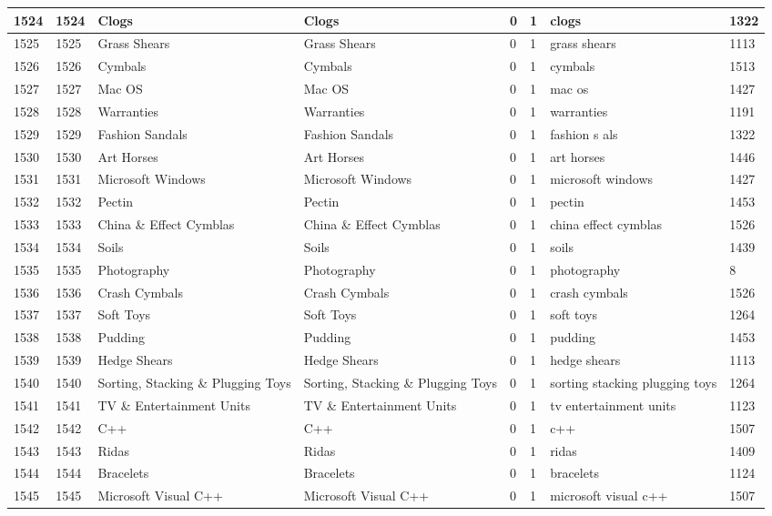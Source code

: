 \begin{longtable}{|l|l|l|l|l|l|l|l|}
1524 & 1524 & Clogs & Clogs & 0 & 1 & clogs & 1322 \\ \hline 
1525 & 1525 & Grass Shears & Grass Shears & 0 & 1 & grass shears & 1113 \\ \hline 
1526 & 1526 & Cymbals & Cymbals & 0 & 1 & cymbals & 1513 \\ \hline 
1527 & 1527 & Mac OS & Mac OS & 0 & 1 & mac os & 1427 \\ \hline 
1528 & 1528 & Warranties & Warranties & 0 & 1 & warranties & 1191 \\ \hline 
1529 & 1529 & Fashion Sandals & Fashion Sandals & 0 & 1 & fashion s als & 1322 \\ \hline 
1530 & 1530 & Art Horses & Art Horses & 0 & 1 & art horses & 1446 \\ \hline 
1531 & 1531 & Microsoft Windows & Microsoft Windows & 0 & 1 & microsoft windows & 1427 \\ \hline 
1532 & 1532 & Pectin & Pectin & 0 & 1 & pectin & 1453 \\ \hline 
1533 & 1533 & China \& Effect Cymblas & China \& Effect Cymblas & 0 & 1 & china effect cymblas & 1526 \\ \hline 
1534 & 1534 & Soils & Soils & 0 & 1 & soils & 1439 \\ \hline 
1535 & 1535 & Photography & Photography & 0 & 1 & photography & 8 \\ \hline 
1536 & 1536 & Crash Cymbals & Crash Cymbals & 0 & 1 & crash cymbals & 1526 \\ \hline 
1537 & 1537 & Soft Toys & Soft Toys & 0 & 1 & soft toys & 1264 \\ \hline 
1538 & 1538 & Pudding & Pudding & 0 & 1 & pudding & 1453 \\ \hline 
1539 & 1539 & Hedge Shears & Hedge Shears & 0 & 1 & hedge shears & 1113 \\ \hline 
1540 & 1540 & Sorting, Stacking \& Plugging Toys & Sorting, Stacking \& Plugging Toys & 0 & 1 & sorting stacking plugging toys & 1264 \\ \hline 
1541 & 1541 & TV \& Entertainment Units & TV \& Entertainment Units & 0 & 1 & tv entertainment units & 1123 \\ \hline 
1542 & 1542 & C++ & C++ & 0 & 1 & c++ & 1507 \\ \hline 
1543 & 1543 & Ridas & Ridas & 0 & 1 & ridas & 1409 \\ \hline 
1544 & 1544 & Bracelets & Bracelets & 0 & 1 & bracelets & 1124 \\ \hline 
1545 & 1545 & Microsoft Visual C++ & Microsoft Visual C++ & 0 & 1 & microsoft visual c++ & 1507 \\ \hline 

\end{longtable}
